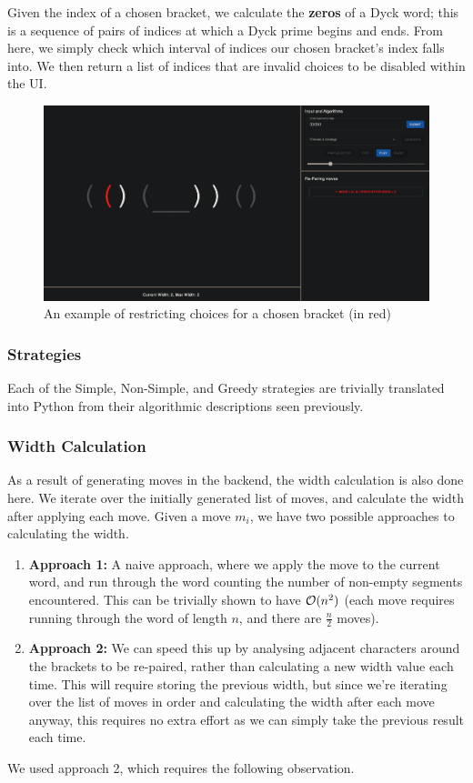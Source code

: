 Given the index of a chosen bracket, we calculate the \textbf{zeros} of a Dyck word; this is a sequence of pairs of indices at which a Dyck prime begins and ends. From here, we simply check which interval of indices our chosen bracket's index falls into. We then return a list of indices that are invalid choices to be disabled within the UI.

\begin{figure}[H]
    \centering
    \includegraphics[scale=0.195]{./images/manualRestriction.png}
    \caption{An example of restricting choices for a chosen bracket (in red)}
    \label{fig:manualRestriction}
\end{figure}

\subsubsection{Strategies}
Each of the Simple, Non-Simple, and Greedy strategies are trivially translated into Python from their algorithmic descriptions seen previously.

\subsubsection{Width Calculation}
As a result of generating moves in the backend, the width calculation is also done here. We iterate over the initially generated list of moves, and calculate the width after applying each move. Given a move $m_{i}$, we have two possible approaches to calculating the width.
\begin{enumerate}
    \item \textbf{Approach 1:} A naive approach, where we apply the move to the current word, and run through the word counting the number of non-empty segments encountered. This can be trivially shown to have $\mathcal{O}(n^{2})$ (each move requires running through the word of length $n$, and there are $\frac{n}{2}$ moves).
    \item \textbf{Approach 2:} We can speed this up by analysing adjacent characters around the brackets to be re-paired, rather than calculating a new width value each time. This will require storing the previous width, but since we're iterating over the list of moves in order and calculating the width after each move anyway, this requires no extra effort as we can simply take the previous result each time.
\end{enumerate}
We used approach 2, which requires the following observation.

